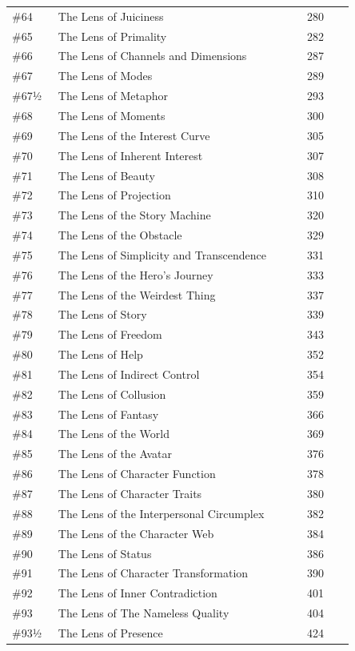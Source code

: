 \documentclass[11pt]{article}
\begin{document}
\begin{longtable}{@{}p{0.10\linewidth}p{0.63\linewidth}p{0.12\linewidth}@{}}
\#64 & The Lens of Juiciness & 280 \\
\#65 & The Lens of Primality & 282 \\
\#66 & The Lens of Channels and Dimensions & 287 \\
\#67 & The Lens of Modes & 289 \\
\#67½ & The Lens of Metaphor & 293 \\
\#68 & The Lens of Moments & 300 \\
\#69 & The Lens of the Interest Curve & 305 \\
\#70 & The Lens of Inherent Interest & 307 \\
\#71 & The Lens of Beauty & 308 \\
\#72 & The Lens of Projection & 310 \\
\#73 & The Lens of the Story Machine & 320 \\
\#74 & The Lens of the Obstacle & 329 \\
\#75 & The Lens of Simplicity and Transcendence & 331 \\
\#76 & The Lens of the Hero’s Journey & 333 \\
\#77 & The Lens of the Weirdest Thing & 337 \\
\#78 & The Lens of Story & 339 \\
\#79 & The Lens of Freedom & 343 \\
\#80 & The Lens of Help & 352 \\
\#81 & The Lens of Indirect Control & 354 \\
\#82 & The Lens of Collusion & 359 \\
\#83 & The Lens of Fantasy & 366 \\
\#84 & The Lens of the World & 369 \\
\#85 & The Lens of the Avatar & 376 \\
\#86 & The Lens of Character Function & 378 \\
\#87 & The Lens of Character Traits & 380 \\
\#88 & The Lens of the Interpersonal Circumplex & 382 \\
\#89 & The Lens of the Character Web & 384 \\
\#90 & The Lens of Status & 386 \\
\#91 & The Lens of Character Transformation & 390 \\
\#92 & The Lens of Inner Contradiction & 401 \\
\#93 & The Lens of The Nameless Quality & 404 \\
\#93½ & The Lens of Presence & 424 \\

\end{longtable}
\end{document}

